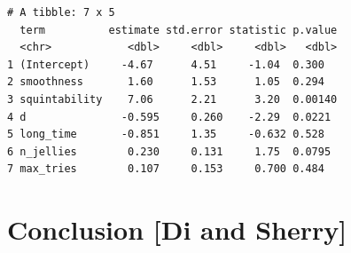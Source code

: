 \documentclass[
  number,
  preprint,
  3p]{elsarticle}
\begin{document}
\begin{verbatim}
# A tibble: 7 x 5
  term          estimate std.error statistic p.value
  <chr>            <dbl>     <dbl>     <dbl>   <dbl>
1 (Intercept)     -4.67      4.51     -1.04  0.300  
2 smoothness       1.60      1.53      1.05  0.294  
3 squintability    7.06      2.21      3.20  0.00140
4 d               -0.595     0.260    -2.29  0.0221 
5 long_time       -0.851     1.35     -0.632 0.528  
6 n_jellies        0.230     0.131     1.75  0.0795 
7 max_tries        0.107     0.153     0.700 0.484  
\end{verbatim}

\section{Conclusion {[}Di and Sherry{]}}\label{sec-conclusion}


\renewcommand\refname{References}
  
\end{document}
